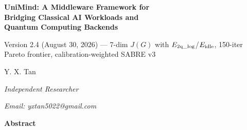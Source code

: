 ﻿\documentclass[12pt,a4paper]{article}
\begin{document}
\begin{titlepage}
\centering
\vspace*{2cm}

{\LARGE\bfseries UniMind: A Middleware Framework for\\[6pt]
Bridging Classical AI Workloads and\\[6pt]
Quantum Computing Backends\par}

\vspace{0.8cm}

{\normalsize\rmfamily Version 2.4 (August 30, 2026) --- 7-dim $J(G)$ with $E_{\rm 2q\_log}$/$E_{\rm idle}$, 150-iter Pareto frontier, calibration-weighted SABRE v3\par}

\vspace{1.2cm}

{\Large Y. X. Tan\par}
\vspace{0.3cm}
{\normalsize\itshape Independent Researcher\par}
{\normalsize\itshape Email: yxtan5022@gmail.com\par}

\vspace{1.8cm}

{\large\bfseries Abstract\par}
\vspace{0.5cm}


\end{titlepage}
\end{document}
